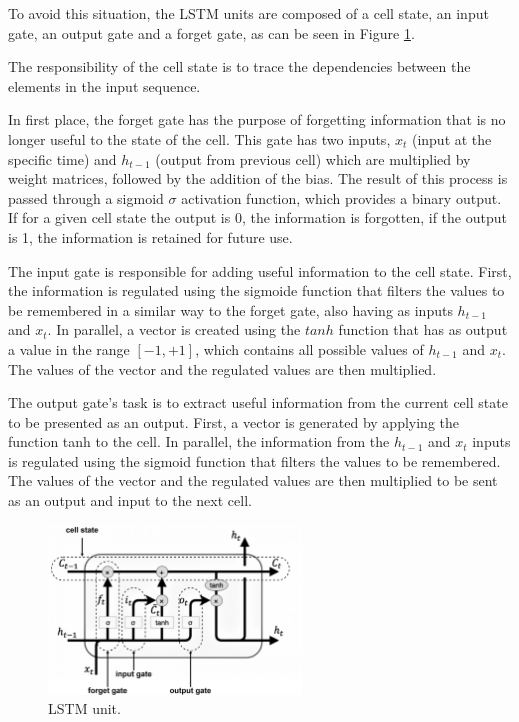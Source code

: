 To avoid this situation, the \ac{LSTM} units are composed of a cell state, an input gate, an output gate and a forget gate, as can be seen in Figure \ref{lstm}.

The responsibility of the cell state is to trace the dependencies between the elements in the input sequence. 

In first place, the forget gate has the purpose of forgetting information that is no longer useful to the state of the cell. This gate has two inputs, $x_t$ (input at the specific time) and $h_{t-1}$ (output from previous cell) which are multiplied by weight matrices, followed by the addition of the bias. The result of this process is passed through a sigmoid $\sigma$ activation function, which provides a binary output. If for a given cell state the output is 0, the information is forgotten, if the output is 1, the information is retained for future use.

The input gate is responsible for adding useful information to the cell state. First, the information is regulated using the sigmoide function that filters the values to be remembered in a similar way to the forget gate, also having as inputs $h_{t-1}$ and $x_t$. In parallel, a vector is created using the $tanh$ function that has as output a value in the range $ [-1, +1]$, which contains all possible values of $h_{t-1}$ and $x_t$. The values of the vector and the regulated values are then multiplied. 

The output gate's task is to extract useful information from the current cell state to be presented as an output. First, a vector is generated by applying the function tanh to the cell. In parallel, the information from the $h_{t-1}$ and $x_t$ inputs is regulated using the sigmoid function that filters the values to be remembered. The values of the vector and the regulated values are then multiplied to be sent as an output and input to the next cell.

 
\begin{figure}[h!]
    \centering
    \begin{center}
    \includegraphics[width=0.6\textwidth]{Images/LSTM_cell_detailed.png}
    \caption{LSTM unit.}
    \label{lstm}
    \end{center}
\end{figure}


